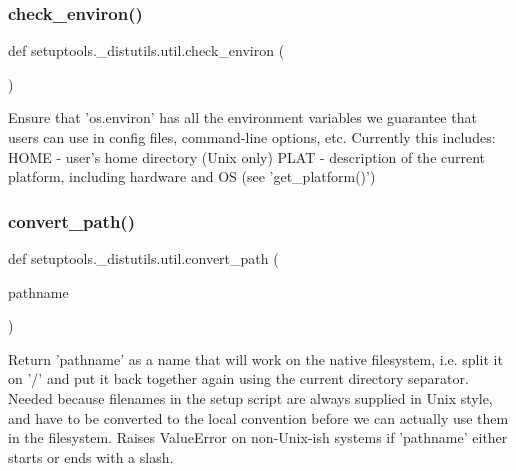 \subsubsection{\texorpdfstring{check\+\_\+environ()}{check\_environ()}}
{\footnotesize\ttfamily def setuptools.\+\_\+distutils.\+util.\+check\+\_\+environ (\begin{DoxyParamCaption}{ }\end{DoxyParamCaption})}

\begin{DoxyVerb}Ensure that 'os.environ' has all the environment variables we
guarantee that users can use in config files, command-line options,
etc.  Currently this includes:
  HOME - user's home directory (Unix only)
  PLAT - description of the current platform, including hardware
         and OS (see 'get_platform()')
\end{DoxyVerb}
 \mbox{\label{namespacesetuptools_1_1__distutils_1_1util_ae1cdd02c6b0bef4b045cf5cf465ba690}} 
\subsubsection{\texorpdfstring{convert\+\_\+path()}{convert\_path()}}
{\footnotesize\ttfamily def setuptools.\+\_\+distutils.\+util.\+convert\+\_\+path (\begin{DoxyParamCaption}\item[{}]{pathname }\end{DoxyParamCaption})}

\begin{DoxyVerb}Return 'pathname' as a name that will work on the native filesystem,
i.e. split it on '/' and put it back together again using the current
directory separator.  Needed because filenames in the setup script are
always supplied in Unix style, and have to be converted to the local
convention before we can actually use them in the filesystem.  Raises
ValueError on non-Unix-ish systems if 'pathname' either starts or
ends with a slash.
\end{DoxyVerb}
 \mbox{\label{namespacesetuptools_1_1__distutils_1_1util_a8f19d58dfdd1f3f55b8924afe0cf190b}} 

